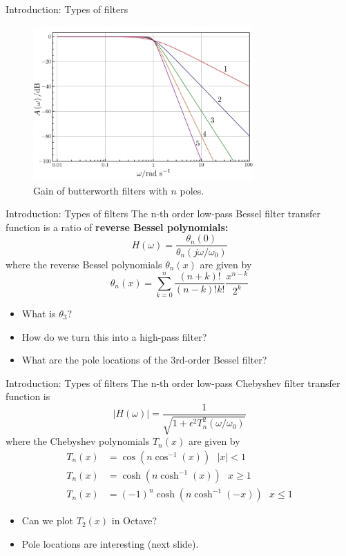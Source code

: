 \documentclass{beamer}
\begin{document}
\begin{frame}{Introduction: Types of filters}
\begin{figure}
\centering
\includegraphics[width=0.75\textwidth]{figures/filtersb.png}
\caption{\label{fig:filters4} Gain of butterworth filters with $n$ poles.}
\end{figure}
\end{frame}

\begin{frame}{Introduction: Types of filters}
\small
The n-th order low-pass Bessel filter transfer function is a ratio of \textbf{reverse Bessel polynomials:}
\begin{equation}
H(\omega) = \frac{\theta_n(0)}{\theta_n(j\omega/\omega_0)}
\end{equation}
where the reverse Bessel polynomials $\theta_n(x)$ are given by
\begin{equation}
\theta_n(x) = \sum_{k=0}^{n} \frac{(n+k)!}{(n-k)!k!}\frac{x^{n-k}}{2^k}
\end{equation}
\begin{itemize}
\item What is $\theta_3$?
\item How do we turn this into a high-pass filter?
\item What are the pole locations of the 3rd-order Bessel filter?
\end{itemize}
\end{frame}

\begin{frame}{Introduction: Types of filters}
\small
The n-th order low-pass Chebyshev filter transfer function is
\begin{equation}
|H(\omega)| = \frac{1}{\sqrt{1+\epsilon^2 T_n^2(\omega/\omega_0)}}
\end{equation}
where the Chebyshev polynomials $T_n(x)$ are given by
\begin{align}
T_n(x) &= \cos(n\cos^{-1}(x)) ~~~|x| < 1 \\
T_n(x) &= \cosh(n\cosh^{-1}(x)) ~~~x \geq 1 \\
T_n(x) &= (-1)^n\cosh(n\cosh^{-1}(-x)) ~~~x \leq 1
\end{align}
\begin{itemize}
\item Can we plot $T_2(x)$ in Octave?
\item Pole locations are interesting (next slide).
\end{itemize}
\end{frame}
\end{document}
